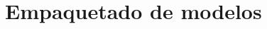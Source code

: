 \documentclass[10pt,border=3pt,tikz]{beamer}
\begin{document}
    \section{Empaquetado de modelos}
    
    \begin{frame}
        \sectionpage
    \end{frame}
	
\end{document}
